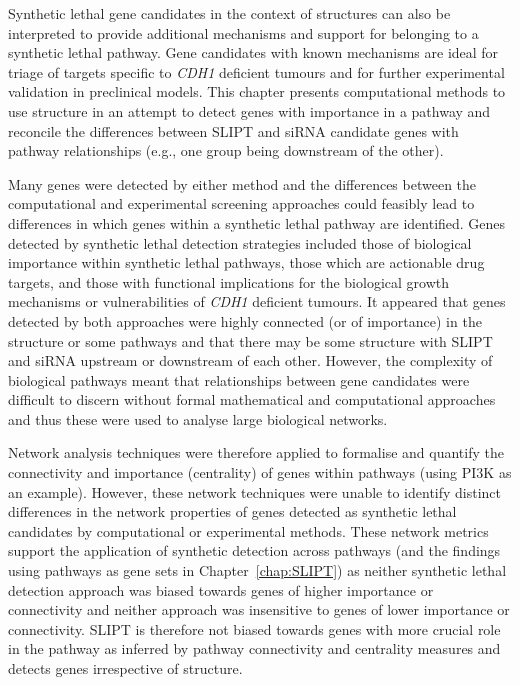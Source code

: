 Synthetic lethal gene candidates in the context of  structures can also be interpreted to provide additional mechanisms and support for belonging to a \gls{synthetic lethal} pathway. Gene candidates with known mechanisms are ideal for triage of targets specific to \textit{CDH1} deficient tumours and for further experimental validation in preclinical models.
This chapter presents computational methods to use  structure in an attempt to detect genes with importance in a pathway and reconcile the differences between \gls{SLIPT} and \gls{siRNA} candidate genes with pathway relationships (e.g., one group being downstream of the other).

Many genes were detected by either method and the differences between the computational and experimental screening approaches could feasibly lead to differences in which genes within a \gls{synthetic lethal} pathway are identified. Genes detected by \gls{synthetic lethal} detection strategies included those of biological importance within \gls{synthetic lethal} pathways, those which are actionable drug targets, and those with functional implications for the biological growth mechanisms or vulnerabilities of \textit{CDH1} deficient tumours. It appeared that genes detected by both approaches were highly connected (or of importance) in the  structure or some pathways and that there may be some structure with \gls{SLIPT} and \gls{siRNA} upstream or downstream of each other. However, the complexity of biological pathways meant that relationships between gene candidates were difficult to discern without formal mathematical and computational approaches and thus these were used to analyse large biological networks.

Network analysis techniques were therefore applied to formalise and quantify the connectivity and importance (centrality) of genes within pathways (using \gls{PI3K} as an example). However, these network techniques were unable to identify distinct differences in the network properties of genes detected as \gls{synthetic lethal} candidates by computational or experimental methods. These network metrics support the application of synthetic detection across pathways (and the findings using pathways as gene sets in Chapter~\ref{chap:SLIPT}) as neither \gls{synthetic lethal} detection approach was biased towards genes of higher importance or connectivity and neither approach was insensitive to genes of lower  importance or connectivity. \gls{SLIPT} is therefore not biased towards genes with  more crucial role in the pathway as inferred by pathway connectivity and \gls{centrality} measures and detects genes irrespective of  structure. 

